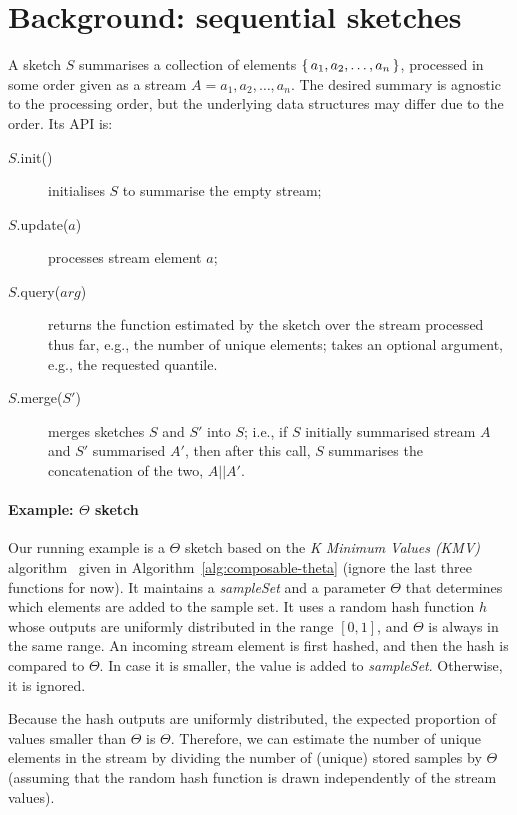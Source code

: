 \section{Background: sequential sketches}
\label{sec:background}

A sketch $S$ summarises a collection of elements \linebreak $\{\,a_1,a_2,\dots,a_n\,\}$, processed
in some order given as a stream $A=a_1,a_2,\dots,a_n$.
The desired summary is agnostic to the processing order,
but the underlying data structures may differ due to the order. Its API is:

\begin{description}
\item[$S$.init()] initialises $S$ to summarise the empty stream;
\item[$S$.update($a$)] processes stream element $a$;
\item[$S$.query($arg$)] returns the function estimated by the sketch over the stream processed thus far, e.g., the number of unique elements; 
 takes an optional argument, e.g., the requested quantile.
 \item[$S$.merge($S'$)] merges sketches $S$ and $S'$ into $S$; i.e., if $S$ initially summarised stream $A$ and $S'$ 
 summarised $A'$, then after this call, $S$ summarises the concatenation of the two, $A||A'$.
\end{description}

\paragraph{Example: $\Theta$ sketch}

Our running example is a $\Theta$ sketch based on the 
\emph{K Minimum Values (KMV)} algorithm~\cite{KMV} given in Algorithm~\ref{alg:composable-theta} (ignore the last
three functions for now). It maintains a \emph{sampleSet} and a parameter $\Theta$
that determines which elements are added to the sample set. 
It uses a random hash function $h$ whose outputs are uniformly distributed
in the range $[0,1]$, and $\Theta$ is always in the same range.  
An incoming stream element is first hashed, and then the hash is compared to $\Theta$. 
In case it is smaller, the value is added to \emph{sampleSet}.  Otherwise, it is ignored. 

Because the hash outputs are uniformly distributed, the expected proportion of values
smaller than $\Theta$ is $\Theta$. 
Therefore, we can estimate the number of unique elements in the stream by
dividing the number of (unique) stored samples by $\Theta$ (assuming that the random hash function is
drawn independently of the stream values).

